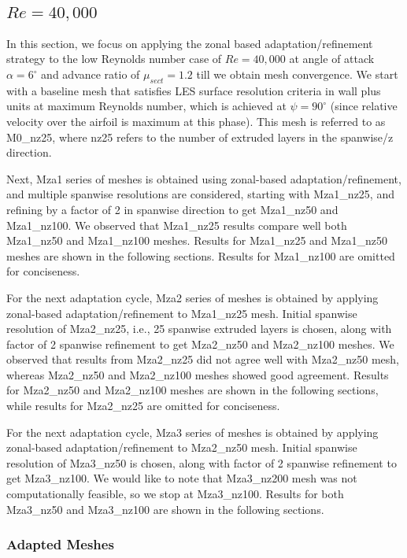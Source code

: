 \subsection{ $Re=40,000$}

In this section, we focus on applying the zonal based adaptation/refinement strategy to the low Reynolds number case of $Re=40,000$ at angle of attack $\alpha=6^\circ$ and advance ratio of $\mu_{sect}=1.2$ till we obtain mesh convergence.
We start with a baseline mesh that satisfies LES surface resolution criteria in wall plus units at maximum Reynolds number, which is achieved at $\psi=90^\circ$ (since relative velocity over the airfoil is maximum at this phase). 
This mesh is referred to as M0\_nz25, where nz25 refers to the number of extruded layers in the spanwise/z direction.

Next, Mza1 series of meshes is obtained using zonal-based adaptation/refinement, and multiple spanwise resolutions are considered, starting with Mza1\_nz25, and refining by a factor of 2 in spanwise direction to get Mza1\_nz50 and Mza1\_nz100.
We observed that Mza1\_nz25 results compare well both Mza1\_nz50 and Mza1\_nz100 meshes.
Results for Mza1\_nz25 and Mza1\_nz50 meshes are shown in the following sections.
Results for Mza1\_nz100 are omitted for conciseness.

For the next adaptation cycle, Mza2 series of meshes is obtained by applying  zonal-based adaptation/refinement to Mza1\_nz25 mesh.
Initial spanwise resolution of Mza2\_nz25, i.e., 25 spanwise extruded layers is chosen, along with factor of 2 spanwise refinement to get Mza2\_nz50 and Mza2\_nz100 meshes. 
We observed that results from Mza2\_nz25 did not agree well with Mza2\_nz50 mesh, whereas Mza2\_nz50 and Mza2\_nz100 meshes showed good agreement.
Results for Mza2\_nz50 and Mza2\_nz100 meshes are shown in the following sections, while results for Mza2\_nz25 are omitted for conciseness.

For the next adaptation cycle, Mza3 series of meshes is obtained by applying  zonal-based adaptation/refinement to Mza2\_nz50 mesh. 
Initial spanwise resolution of Mza3\_nz50 is chosen, along with factor of 2 spanwise refinement to get Mza3\_nz100. 
We would like to note that Mza3\_nz200 mesh was not computationally feasible, so we stop at Mza3\_nz100.
Results for both Mza3\_nz50 and Mza3\_nz100 are shown in the following sections.

\subsubsection{Adapted Meshes}

\label{sec:zonal_mesh_and_error}

